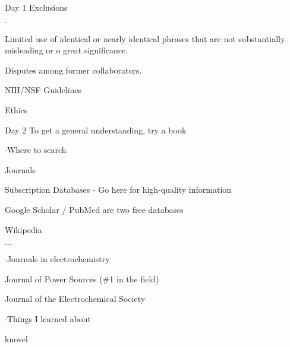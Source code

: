 \documentclass{article}
\begin{document}
\begin{section}{Day 1}
  Exclusions\begin{list}{$\cdot$}{}
  \item Limited use of identical or nearly identical phrases that are not substantially misleading or o great significance.
  \item Disputes among former collaborators.
  \end{list}
  \begin{list}{NIH/NSF Guidelines}{}
  \item 
  \end{list}
  \begin{list}{Ethics}{}
  \item 
  \end{list}
\end{section}


\begin{section}{Day 2}
To get a general understanding, try a book

\begin{list}{$\cdot$}{Where to search}
\item Journals
\item Subscription Databases - Go here for high-quality information
\item Google Scholar / PubMed are two free databases
\item Wikipedia
\item $\ldots$
\end{list}
\begin{list}{$\cdot$}{Journals in electrochemistry}
\item Journal of Power Sources (\#1 in the field)
\item Journal of the Electrochemical Society
\end{list}

\begin{list}{$\cdot$}{Things I learned about}
\item knovel
\end{list}
\end{section}
\end{document}
